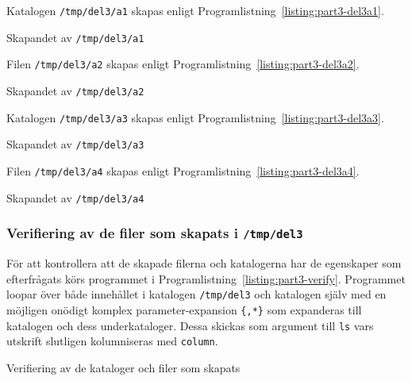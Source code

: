 Katalogen \texttt{/tmp/del3/a1} skapas enligt Programlistning~\ref{listing:part3-del3a1}.

\begin{listing}[H]
\caption{Skapandet av \texttt{/tmp/del3/a1}}
\label{listing:part3-del3a1}
\end{listing}


Filen \texttt{/tmp/del3/a2} skapas enligt Programlistning~\ref{listing:part3-del3a2}.

\begin{listing}[H]
\caption{Skapandet av \texttt{/tmp/del3/a2}}
\label{listing:part3-del3a2}
\end{listing}


Katalogen \texttt{/tmp/del3/a3} skapas enligt Programlistning~\ref{listing:part3-del3a3}.

\begin{listing}[H]
\caption{Skapandet av \texttt{/tmp/del3/a3}}
\label{listing:part3-del3a3}
\end{listing}


Filen \texttt{/tmp/del3/a4} skapas enligt Programlistning~\ref{listing:part3-del3a4}.

\begin{listing}[H]
\caption{Skapandet av \texttt{/tmp/del3/a4}}
\label{listing:part3-del3a4}
\end{listing}


\subsubsection{Verifiering av de filer som skapats i \texttt{/tmp/del3}}
För att kontrollera att de skapade filerna och katalogerna har de egenskaper
som efterfrågats körs programmet i Programlistning~\ref{listing:part3-verify}.
Programmet loopar över både innehållet i katalogen \texttt{/tmp/del3} och
katalogen själv med en möjligen onödigt komplex parameter-expansion
\texttt{\{,*\}} som expanderas till katalogen och dess underkataloger.  Dessa
skickas som argument till \texttt{ls} vars utskrift slutligen kolumniseras med
\texttt{column}.

\begin{listing}[H]
\caption{Verifiering av de kataloger och filer som skapats}
\label{listing:part3-verify}
\end{listing}

